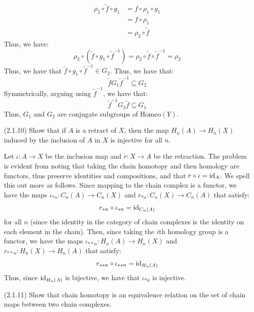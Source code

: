 \documentclass[12pt]{article}
\begin{document}
\begin{solution}
\begin{align*}
        \rho_2 \circ \tilde f \circ g_1 &= f \circ \rho_1 \circ g_1 \\
        &= f \circ \rho_1 \\
        &= \rho_2 \circ \tilde f
    \end{align*} 
    Thus, we have: 
    \[ \rho_2 \circ (\tilde f \circ g_1 \circ \tilde f^{-1}) = \rho_2 \circ \tilde f \circ \tilde f^{-1} = \rho_2\]
    Thus, we have that $\tilde f \circ g_1 \circ \tilde f^{-1} \in G_2$. Thus, we have that: 
    \[ \tilde f G_1\tilde f^{-1} \subseteq G_2\]
    Symmetrically, arguing using $\tilde f^{-1}$, we have that: 
    \[ \tilde f^{-1} G_2\tilde f \subseteq G_1\]
    Thus, $G_1$ and $G_2$ are conjugate subgroups of $\mathrm{Homeo}(Y)$.
\end{solution}
\newpage

\begin{problem}{4}
    (2.1.10) Show that if $A$ is a retract of $X$, then the map $H_n(A) \to H_n(X)$ induced by the inclusion of $A$ in $X$ is injective for all $n$. 
\end{problem}

\begin{solution}
    Let $\iota: A \to X$ be the inclusion map and $r: X \to A$ be the retraction.     The problem is evident from noting that taking the chain homotopy and then homology are functors, thus preserve identities and compositions, and that $r \circ \iota = \operatorname{id}_A$. We spell this out more as follows. \bbni
    Since mapping to the chain complex is a functor, we have the maps $\iota_{*n}: C_n(A) \to C_n(X)$ and $r_{*n}: C_n(X) \to C_n(A)$ that satisfy: 
    \[  r_{*n} \circ \iota_{*n} = \operatorname{id}_{C_n(A)}\]
    for all $n$ (since the identity in the category of chain complexes is the identity on each element in the chain). Then, since taking the $i$th homology group is a functor, we have the maps $\iota_{**n}: H_n(A) \to H_n(X)$ and $r_{**n}: H_n(X) \to H_n(A)$ that satisfy: 
    \[ r_{**n} \circ \iota_{**n} = \operatorname{id}_{H_n(A)}\]
    Thus, since $\operatorname{id}_{H_n(A)}$ is bijective, we have that $\iota_{*n}$ is injective.
\end{solution}
\newpage

\begin{problem}{5}
    (2.1.11) Show that chain homotopy is an equivalence relation on the set of chain maps between two chain complexes.
\end{problem}
\end{document}
